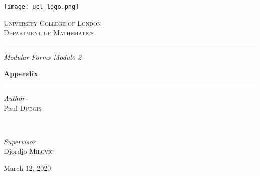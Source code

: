 \clearpage\null\newpage
\begin{titlepage}
	\newcommand{\HRule}{\rule{\linewidth}{0.5mm}}
		\begin{center}
		\texttt{[image: ucl\_logo.png]}
		\vspace*{1cm}
		
		\textsc{\LARGE University College of London}\\[0.75cm]
		\textsc{\LARGE Department of Mathematics}
		
		\vspace{1.5cm}
		
		\HRule
		\vspace{0.75cm}
		
		\textit{\LARGE Modular Forms Modulo 2}
		\vspace{0.5cm}
		
		\textbf{\huge Appendix}
		
		\vspace{0.5cm}
		\HRule
		
		\vspace{1.5cm}
		
		\begin{minipage}{0.4\textwidth}
			\begin{flushleft}
				\large
				\textit{Author}\\
				Paul \textsc{Dubois}
			\end{flushleft}
		\end{minipage}
		~
		\begin{minipage}{0.4\textwidth}
			\begin{flushright}
				\large
				\textit{Supervisor}\\
				Djordjo \textsc{Milovic}
			\end{flushright}
		\end{minipage}
		
		\vfill
		
		{\large March 12, 2020}
	\end{center}
\end{titlepage}